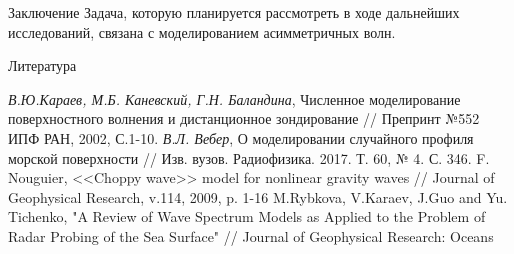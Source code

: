 \begin{frame}[t]{}
\begin{columns}[t]
\begin{column}{.48\linewidth}
\begin{block}{Заключение}
Задача, которую планируется рассмотреть в ходе дальнейших исследований, связана с моделированием асимметричных волн.
        \end{block}
        \begin{block}{Литература}
            \footnotesize
            \begin{thebibliography}{}
                 \textit{В.Ю.Караев, М.Б. Каневский, Г.Н. Баландина}, Численное моделирование поверхностного волнения и дистанционное зондирование // Препринт №552 ИПФ РАН, 2002, С.1-10.
                 \textit{В.Л. Вебер}, О моделировании случайного профиля морской поверхности // Изв. вузов. Радиофизика. 2017. Т. 60, № 4. С. 346.
                 F. Nouguier, <<Choppy wave>> model for nonlinear gravity waves // Journal of Geophysical Research, v.114, 2009, p. 1-16
                 M.Rybkova, V.Karaev, J.Guo and Yu. Tichenko, "A Review 
                of Wave Spectrum Models as Applied to the Problem of Radar Probing 
                of the Sea Surface" // Journal of Geophysical Research: Oceans
            \end{thebibliography}
        \end{block}
      \end{column}
    \end{columns}
  \end{frame}

